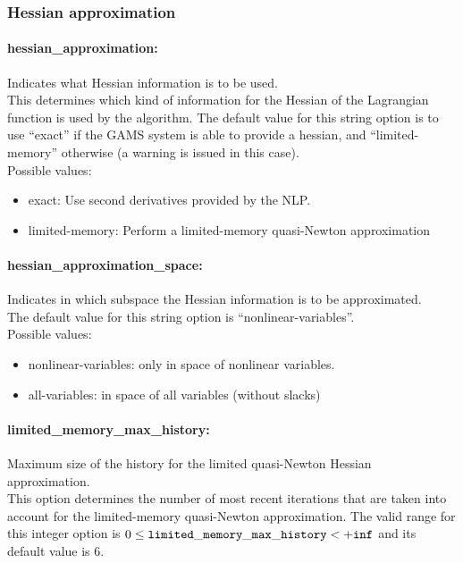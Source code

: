 \subsubsection{Hessian approximation}

\paragraph{hessian\_approximation:} Indicates what Hessian information is to be used. $\;$ \\
 This determines which kind of information for the
Hessian of the Lagrangian function is used by the
algorithm.
The default value for this string option is to use ``exact'' if the GAMS system is able to provide a hessian, and ``limited-memory'' otherwise (a warning is issued in this case).
\\ 
Possible values:
\begin{itemize}
   \item exact: Use second derivatives provided by the NLP.
   \item limited-memory: Perform a limited-memory quasi-Newton
approximation
\end{itemize}

\paragraph{hessian\_approximation\_space:} Indicates in which subspace the Hessian information is to be approximated. \\
The default value for this string option is ``nonlinear-variables''.
\\ 
Possible values:
\begin{itemize}
   \item nonlinear-variables: only in space of nonlinear variables.
   \item all-variables: in space of all variables (without slacks)
\end{itemize}

\paragraph{limited\_memory\_max\_history:} Maximum size of the history for the limited quasi-Newton Hessian approximation. $\;$ \\
 This option determines the number of most recent
iterations that are taken into account for the
limited-memory quasi-Newton approximation. The valid range for this integer option is
$0 \le {\tt limited\_memory\_max\_history } <  {\tt +inf}$
and its default value is $6$.



